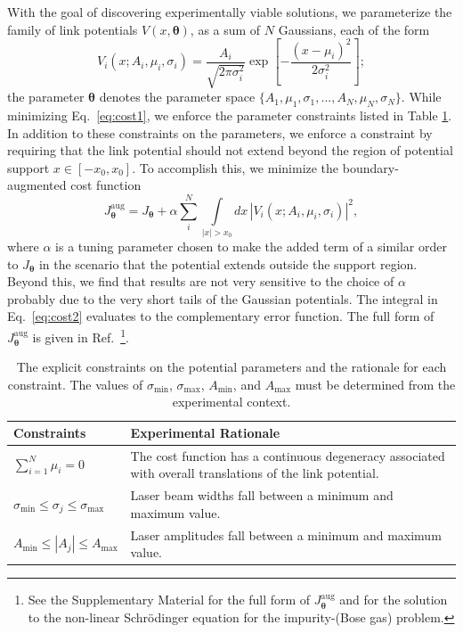 \documentclass[twocolumn,amsmath,amssymb,showpacs,prl,superscriptaddress,aps]{revtex4-1}
\begin{document}
With the goal of discovering experimentally viable solutions, we parameterize the family of link potentials $V(x, \bm{\theta})$, as a sum of $N$ Gaussians, each of the form
\begin{equation}\label{eq:V-param}
V_i(x; A_i, \mu_i, \sigma_i) = \frac{A_i}{\sqrt{2\pi\sigma_i^2}}\exp\left[{-\frac{(x-\mu_i)^2}{2\sigma_i^2}}\right];
\end{equation}
the parameter $\bm{\theta}$ denotes the parameter space $\{A_1, \mu_1, \sigma_1,...,A_N, \mu_N, \sigma_N\}$. While minimizing Eq.~\eqref{eq:cost1}, we enforce the parameter constraints listed in Table \ref{tab:constraints}. In addition to these constraints on the parameters, we enforce a constraint by requiring that the link potential should not extend beyond the region of potential support $x\in[-x_0,x_0]$. 
To accomplish this, we minimize the boundary-augmented cost function
\begin{equation}\label{eq:cost2}
  J_{\bm{\theta}}^{\mathrm{aug}} = J_{\bm{\theta}} + \alpha \sum_i^N\int\limits_{|x|>x_0}dx\,|V_i(x; A_i,\mu_i,\sigma_i)|^2,
\end{equation}
where $\alpha$ is a tuning parameter chosen to make the added term of a similar order to $J_{\mathbf{\theta}}$ in the scenario that the potential extends outside the support region. Beyond this, we find that results are not very sensitive to the choice of $\alpha$ probably due to the very short tails of the Gaussian potentials. The integral in Eq.~\eqref{eq:cost2} evaluates to the complementary error function. The full form of $J_{\bm{\theta}}^{\mathrm{aug}}$ is given in Ref.~\footnote{See the Supplementary Material for the full form of $J_{\bm{\theta}}^{\mathrm{aug}}$ and 
for the solution to the non-linear Schr{\"o}dinger equation for the impurity-(Bose gas) problem.}.

\begin{table}[t]
  \renewcommand*{\arraystretch}{1.4}
  \begin{tabular}{m{3cm}|m{5.5cm}}
    Constraints & Experimental Rationale \\
    \hline\hline
    $\sum_{i=1}^{N}\mu_i = 0$ & The cost function has a continuous degeneracy associated with overall translations of the link potential. \\
    \hline
    $\sigma_{\mathrm{min}} \leq \sigma_j \leq \sigma_{\mathrm{max}} $ & Laser beam widths fall between a minimum and maximum value.\\
    \hline
    $A_{\mathrm{min}} \leq |A_j| \leq A_{\mathrm{max}}$ & Laser amplitudes fall between a minimum and maximum value.
  \end{tabular}
  \caption{The explicit constraints on the potential parameters and the rationale for each constraint. The values of $\sigma_{\mathrm{min}}$, $\sigma_{\mathrm{max}}$, $A_{\mathrm{min}}$, and $A_{\mathrm{max}}$ must be determined from the experimental context.}
  \label{tab:constraints}
\end{table}
\end{document}
